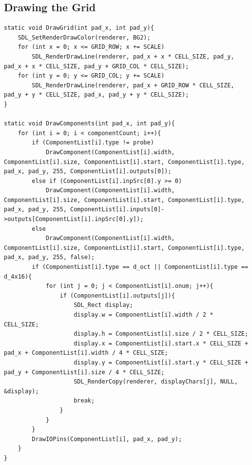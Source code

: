 \documentclass[report]{subfiles}
\begin{document}
	\subsection{Drawing the Grid}
\begin{lstlisting}
static void DrawGrid(int pad_x, int pad_y){
    SDL_SetRenderDrawColor(renderer, BG2);
    for (int x = 0; x <= GRID_ROW; x += SCALE)
        SDL_RenderDrawLine(renderer, pad_x + x * CELL_SIZE, pad_y, pad_x + x * CELL_SIZE, pad_y + GRID_COL * CELL_SIZE);
    for (int y = 0; y <= GRID_COL; y += SCALE)
        SDL_RenderDrawLine(renderer, pad_x + GRID_ROW * CELL_SIZE, pad_y + y * CELL_SIZE, pad_x, pad_y + y * CELL_SIZE);
}

static void DrawComponents(int pad_x, int pad_y){
    for (int i = 0; i < componentCount; i++){
        if (ComponentList[i].type != probe)
            DrawComponent(ComponentList[i].width, ComponentList[i].size, ComponentList[i].start, ComponentList[i].type, pad_x, pad_y, 255, ComponentList[i].outputs[0]);
        else if (ComponentList[i].inpSrc[0].y >= 0)
            DrawComponent(ComponentList[i].width, ComponentList[i].size, ComponentList[i].start, ComponentList[i].type, pad_x, pad_y, 255, ComponentList[i].inputs[0]->outputs[ComponentList[i].inpSrc[0].y]);
        else
            DrawComponent(ComponentList[i].width, ComponentList[i].size, ComponentList[i].start, ComponentList[i].type, pad_x, pad_y, 255, false);
        if (ComponentList[i].type == d_oct || ComponentList[i].type == d_4x16){
            for (int j = 0; j < ComponentList[i].onum; j++){
                if (ComponentList[i].outputs[j]){
                    SDL_Rect display;
                    display.w = ComponentList[i].width / 2 * CELL_SIZE;
                    display.h = ComponentList[i].size / 2 * CELL_SIZE;
                    display.x = ComponentList[i].start.x * CELL_SIZE + pad_x + ComponentList[i].width / 4 * CELL_SIZE;
                    display.y = ComponentList[i].start.y * CELL_SIZE + pad_y + ComponentList[i].size / 4 * CELL_SIZE;
                    SDL_RenderCopy(renderer, displayChars[j], NULL, &display);
                    break;
                }
            }
        }
        DrawIOPins(ComponentList[i], pad_x, pad_y);
    }
}
\end{lstlisting}
\end{document}
